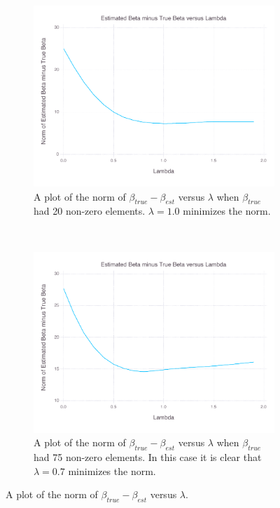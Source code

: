\documentclass[12pt, leqno]{article}
\begin{document}
\begin{figure}
\centering 
\begin{subfigure}[b]{0.5\textwidth}
  \includegraphics[width=\textwidth]{betaoptplotcount-20.pdf}
  \caption{A plot of the norm of $\beta_{true} -
    \beta_{est}$ versus $\lambda$ when $\beta_{true}$ had 20 non-zero
    elements. $\lambda = 1.0$ minimizes the norm.}
\label{fig:beta20}
\end{subfigure}\\
\begin{subfigure}[b]{0.5\textwidth}
  \includegraphics [width=\textwidth]{betaoptplotcount-75.pdf}
  \caption{A plot of the norm of $\beta_{true} -
    \beta_{est}$ versus $\lambda$ when $\beta_{true}$ had 75 non-zero
    elements. In this case it is clear that $\lambda = 0.7$ minimizes
    the norm.}
\label{fig:beta75}
\end{subfigure}
        \caption{A plot of the norm of $\beta_{true} -
    \beta_{est}$  versus $\lambda$. }\label{fig:sparse}
\end{figure}
\end{document}
